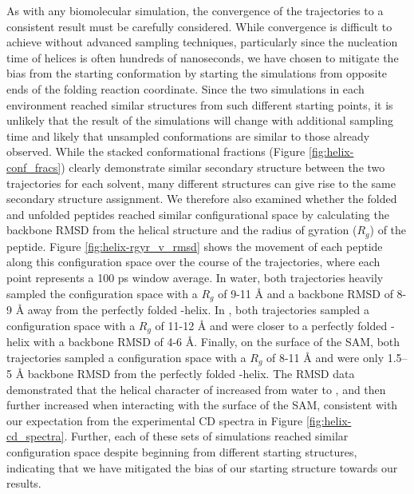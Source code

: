 As with any biomolecular simulation, the convergence of the trajectories to a consistent result must be carefully considered. 
While convergence is difficult to achieve without advanced sampling techniques, particularly since the nucleation time of helices is often hundreds of nanoseconds, we have chosen to mitigate the bias from the starting conformation by starting the simulations from opposite ends of the folding reaction coordinate. 
Since the two simulations in each environment reached similar structures from such different starting points, it is unlikely that the result of the simulations will change with additional sampling time and likely that unsampled conformations are similar to those already observed. 
While the stacked conformational fractions (Figure \ref{fig:helix-conf_fracs}) clearly demonstrate similar secondary structure between the two trajectories for each solvent, many different structures can give rise to the same secondary structure assignment. 
We therefore also examined whether the folded and unfolded peptides reached similar configurational space by calculating the backbone RMSD from the helical structure and the radius of gyration ($R_g$) of the peptide. 
Figure \ref{fig:helix-rgyr_v_rmsd} shows the movement of each peptide along this configuration space over the course of the trajectories, where each point represents a 100 ps window average. 
In water, both trajectories heavily sampled the configuration space with a $R_g$ of 9-11 \si{\angstrom} and a backbone RMSD of 8-9 \si{\angstrom} away from the perfectly folded \textalpha{}-helix. 
In \tbawat{}, both trajectories sampled a configuration space with a $R_g$ of 11-12 \si{\angstrom} and were closer to a perfectly folded \textalpha{}-helix with a backbone RMSD of 4-6 \si{\angstrom}. 
Finally, on the surface of the SAM, both trajectories sampled a configuration space with a $R_g$ of 8-11 \si{\angstrom} and were only 1.5–5 \si{\angstrom} backbone RMSD from the perfectly folded \textalpha{}-helix. 
The RMSD data demonstrated that the helical character of \pep{} increased from water to \tbawat{}, and then further increased when interacting with the surface of the SAM, consistent with our expectation from the experimental CD spectra in Figure \ref{fig:helix-cd_spectra}. 
Further, each of these sets of simulations reached similar configuration space despite beginning from different starting structures, indicating that we have mitigated the bias of our starting structure towards our results.

